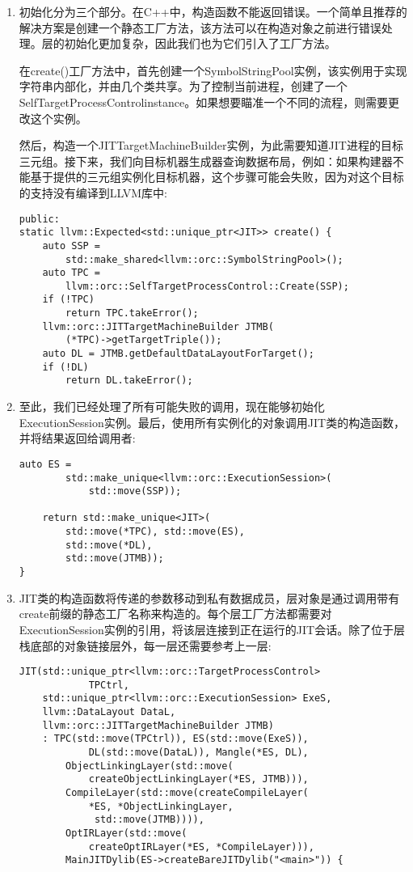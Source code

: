 \begin{enumerate}
\item 初始化分为三个部分。在C++中，构造函数不能返回错误。一个简单且推荐的解决方案是创建一个静态工厂方法，该方法可以在构造对象之前进行错误处理。层的初始化更加复杂，因此我们也为它们引入了工厂方法。\par
在create()工厂方法中，首先创建一个SymbolStringPool实例，该实例用于实现字符串内部化，并由几个类共享。为了控制当前进程，创建了一个SelfTargetProcessControlinstance。如果想要瞄准一个不同的流程，则需要更改这个实例。\par
然后，构造一个JITTargetMachineBuilder实例，为此需要知道JIT进程的目标三元组。接下来，我们向目标机器生成器查询数据布局，例如：如果构建器不能基于提供的三元组实例化目标机器，这个步骤可能会失败，因为对这个目标的支持没有编译到LLVM库中:
\begin{lstlisting}[caption={}]
public:
static llvm::Expected<std::unique_ptr<JIT>> create() {
	auto SSP =
		std::make_shared<llvm::orc::SymbolStringPool>();
	auto TPC =
		llvm::orc::SelfTargetProcessControl::Create(SSP);
	if (!TPC)
		return TPC.takeError();
	llvm::orc::JITTargetMachineBuilder JTMB(
		(*TPC)->getTargetTriple());
	auto DL = JTMB.getDefaultDataLayoutForTarget();
	if (!DL)
		return DL.takeError();
\end{lstlisting}

\item 至此，我们已经处理了所有可能失败的调用，现在能够初始化ExecutionSession实例。最后，使用所有实例化的对象调用JIT类的构造函数，并将结果返回给调用者:
\begin{lstlisting}[caption={}]
	auto ES =
		std::make_unique<llvm::orc::ExecutionSession>(
			std::move(SSP));
	
	return std::make_unique<JIT>(
		std::move(*TPC), std::move(ES),
		std::move(*DL),
		std::move(JTMB));
}
\end{lstlisting}

\item JIT类的构造函数将传递的参数移动到私有数据成员，层对象是通过调用带有create前缀的静态工厂名称来构造的。每个层工厂方法都需要对ExecutionSession实例的引用，将该层连接到正在运行的JIT会话。除了位于层栈底部的对象链接层外，每一层还需要参考上一层:
\begin{lstlisting}[caption={}]
	JIT(std::unique_ptr<llvm::orc::TargetProcessControl>
			TPCtrl,
	std::unique_ptr<llvm::orc::ExecutionSession> ExeS,
	llvm::DataLayout DataL,
	llvm::orc::JITTargetMachineBuilder JTMB)
	: TPC(std::move(TPCtrl)), ES(std::move(ExeS)),
			DL(std::move(DataL)), Mangle(*ES, DL),
		ObjectLinkingLayer(std::move(
			createObjectLinkingLayer(*ES, JTMB))),
		CompileLayer(std::move(createCompileLayer(
			*ES, *ObjectLinkingLayer,
			 std::move(JTMB)))),
		OptIRLayer(std::move(
			createOptIRLayer(*ES, *CompileLayer))),
		MainJITDylib(ES->createBareJITDylib("<main>")) {
\end{lstlisting}


\end{enumerate}
